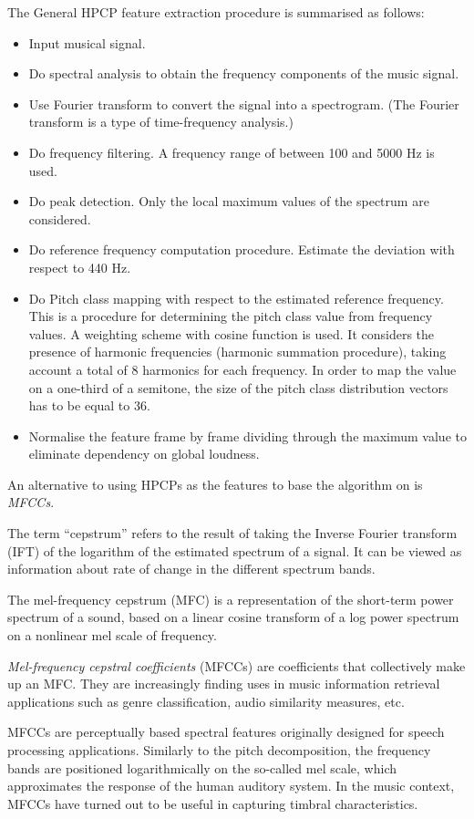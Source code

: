 The General HPCP feature extraction procedure is summarised as follows:
\begin{itemize}
\item Input musical signal.
\item Do spectral analysis to obtain the frequency components of the music signal.
\item Use Fourier transform to convert the signal into a spectrogram. (The Fourier transform is a type of time-frequency analysis.)
\item Do frequency filtering. A frequency range of between 100 and 5000 Hz is used.
\item Do peak detection. Only the local maximum values of the spectrum are considered.
\item Do reference frequency computation procedure. Estimate the deviation with respect to 440 Hz.
\item Do Pitch class mapping with respect to the estimated reference frequency. This is a procedure for determining the pitch class value from frequency values. A weighting scheme with cosine function is used. It considers the presence of harmonic frequencies (harmonic summation procedure), taking account a total of 8 harmonics for each frequency. In order to map the value on a one-third of a semitone, the size of the pitch class distribution vectors has to be equal to 36.
\item Normalise the feature frame by frame dividing through the maximum value to eliminate dependency on global loudness.
\end{itemize}

An alternative to using HPCPs as the features to base the algorithm on is \textit{MFCCs}.

The term ``cepstrum'' refers to the result of taking the Inverse Fourier transform (IFT) of the logarithm of the estimated spectrum of a signal. It can be viewed as information about rate of change in the different spectrum bands.

The mel-frequency cepstrum (MFC) is a representation of the short-term power spectrum of a sound, based on a linear cosine transform of a log power spectrum on a nonlinear mel scale of frequency. 

\textit{Mel-frequency cepstral coefficients} (MFCCs) are coefficients that collectively make up an MFC. They are increasingly finding uses in music information retrieval applications such as genre classification, audio similarity measures, etc.

MFCCs are perceptually based spectral features originally designed for speech processing applications. Similarly to the pitch decomposition, the frequency bands are positioned logarithmically on the so-called mel scale, which approximates the response of the human auditory system. In the music context, MFCCs have turned out to be useful in capturing timbral characteristics.

